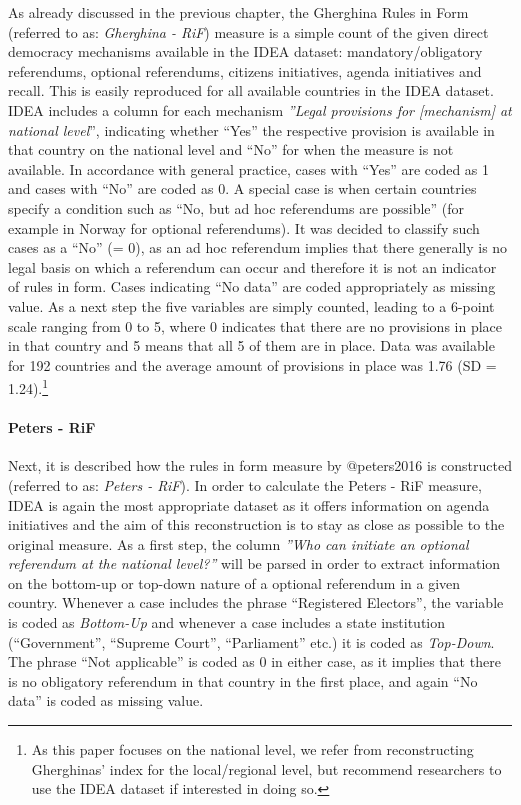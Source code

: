 \documentclass[]{article}
\let\oldparagraph\paragraph
\renewcommand{\paragraph}[1]{\oldparagraph{#1}\mbox{}}
\let\rmarkdownfootnote\footnote%
\def\footnote{\protect\rmarkdownfootnote}
\begin{document}
As already discussed in the previous chapter, the Gherghina Rules in
Form (referred to as: \emph{Gherghina - RiF}) measure is a simple count
of the given direct democracy mechanisms available in the IDEA dataset:
mandatory/obligatory referendums, optional referendums, citizens
initiatives, agenda initiatives and recall. This is easily reproduced
for all available countries in the IDEA dataset. IDEA includes a column
for each mechanism \emph{''Legal provisions for {[}mechanism{]} at
national level}'', indicating whether ``Yes'' the respective provision
is available in that country on the national level and ``No'' for when
the measure is not available. In accordance with general practice, cases
with ``Yes'' are coded as 1 and cases with ``No'' are coded as 0. A
special case is when certain countries specify a condition such as ``No,
but ad hoc referendums are possible'' (for example in Norway for
optional referendums). It was decided to classify such cases as a ``No''
(= 0), as an ad hoc referendum implies that there generally is no legal
basis on which a referendum can occur and therefore it is not an
indicator of rules in form. Cases indicating ``No data'' are coded
appropriately as missing value. As a next step the five variables are
simply counted, leading to a 6-point scale ranging from 0 to 5, where 0
indicates that there are no provisions in place in that country and 5
means that all 5 of them are in place. Data was available for 192
countries and the average amount of provisions in place was 1.76 (SD =
1.24).\footnote{As this paper focuses on the national level, we refer
  from reconstructing Gherghinas' index for the local/regional level,
  but recommend researchers to use the IDEA dataset if interested in
  doing so.}

\paragraph{Peters - RiF}\label{peters---rif}

Next, it is described how the rules in form measure by @peters2016 is
constructed (referred to as: \emph{Peters - RiF}). In order to calculate
the Peters - RiF measure, IDEA is again the most appropriate dataset as
it offers information on agenda initiatives and the aim of this
reconstruction is to stay as close as possible to the original measure.
As a first step, the column \emph{''Who can initiate an optional
referendum at the national level?''} will be parsed in order to extract
information on the bottom-up or top-down nature of a optional referendum
in a given country. Whenever a case includes the phrase ``Registered
Electors'', the variable is coded as \emph{Bottom-Up} and whenever a
case includes a state institution (``Government'', ``Supreme Court'',
``Parliament'' etc.) it is coded as \emph{Top-Down}. The phrase ``Not
applicable'' is coded as 0 in either case, as it implies that there is
no obligatory referendum in that country in the first place, and again
``No data'' is coded as missing value.
\end{document}
